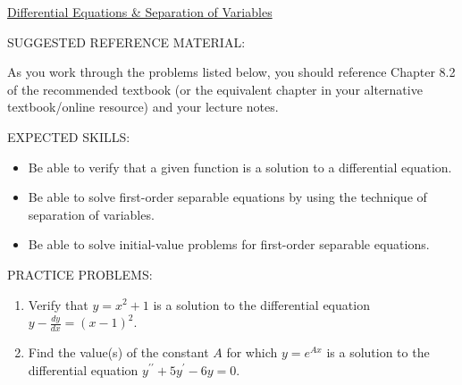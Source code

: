 \documentclass[12pt]{article}
\newif\ifans
\begin{document}
\begin{center}
\underline{\LARGE{Differential Equations \& Separation of Variables}}
\end{center}

\noindent SUGGESTED REFERENCE MATERIAL:

\bigskip

\noindent As you work through the problems listed below, you should reference Chapter 8.2 of the recommended textbook (or the equivalent chapter in your alternative textbook/online resource) and your lecture notes.

\bigskip

\noindent EXPECTED SKILLS:

\begin{itemize}

\item Be able to verify that a given function is a solution to a differential equation.

\item Be able to solve first-order separable equations by using the technique of separation of variables.

\item Be able to solve initial-value problems for first-order separable equations. 

\end{itemize}

\noindent PRACTICE PROBLEMS:

\medskip

\begin{enumerate}

\item Verify that $y=x^2+1$ is a solution to the differential equation $y-\frac{dy}{dx}=(x-1)^2$.

\ifans{\fbox{\parbox{1\linewidth}{Differentiating $y=x^2+1$ with respect to $x$ yields $y^{\prime}=2x$.  Thus,\\
 $$y-\frac{dy}{dx}=(x^2+1)-(2x)=(x-1)^2$$}}} \fi

\item Find the value(s) of the constant $A$ for which $y=e^{Ax}$ is a solution to the differential equation $y^{\prime\prime}+5y^{\prime}-6y=0$.

\ifans{\fbox{$A=-6$ and $A=1$}} \fi

\end{enumerate}

\end{document}
